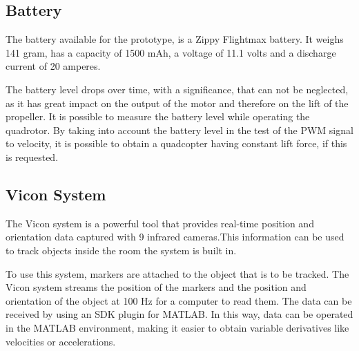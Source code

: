 \subsection{Battery}
The battery available for the prototype, is a Zippy Flightmax battery. It weighs 141 gram, has a capacity of 1500 mAh, a voltage of 11.1 volts and a discharge current of 20 amperes.

The battery level drops over time, with a significance, that can not be neglected, as it has great impact on the output of the motor and therefore on the lift of the propeller. It is possible to measure the battery level while operating the quadrotor. By taking into account the battery level in the test of the PWM signal to velocity, it is possible to obtain a quadcopter having constant lift force, if this is requested.

\subsection{Vicon System}
The Vicon system is a powerful tool that provides real-time position and orientation data captured with 9 infrared cameras.This information can be used to track objects inside the room the system is built in.


To use this system, markers are attached to the object that is to be tracked. The Vicon system streams the position of the markers and the position and orientation of the object at 100 Hz for a computer to read them. The data can be received by using an SDK plugin for MATLAB. In this way, data can be operated in the MATLAB environment, making it easier to obtain variable derivatives like velocities or accelerations.

